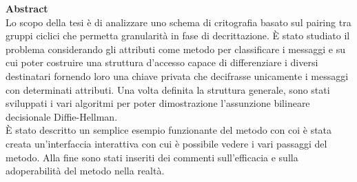 


\vspace*{\fill}
\begin{center}

\begin{minipage}{0.9\textwidth}
\textbf{Abstract}\\
Lo scopo della tesi è di analizzare uno schema di critografia basato sul pairing tra gruppi ciclici che permetta granularità in fase di decrittazione. È stato studiato il problema considerando gli attributi come metodo per classificare i messaggi e su cui poter costruire una struttura d'accesso capace di differenziare i diversi destinatari fornendo loro una chiave privata che decifrasse unicamente i messaggi con determinati attributi. Una volta definita la struttura generale, sono stati sviluppati i vari algoritmi per poter dimostrazione l'assunzione bilineare decisionale Diffie-Hellman.\\
È stato descritto un semplice esempio funzionante del metodo con coi è stata creata un'interfaccia interattiva con cui è possibile vedere i vari passaggi del metodo. Alla fine sono stati inseriti dei commenti sull'efficacia e sulla adoperabilità del metodo nella realtà.
\end{minipage}

\end{center}
\vfill %
